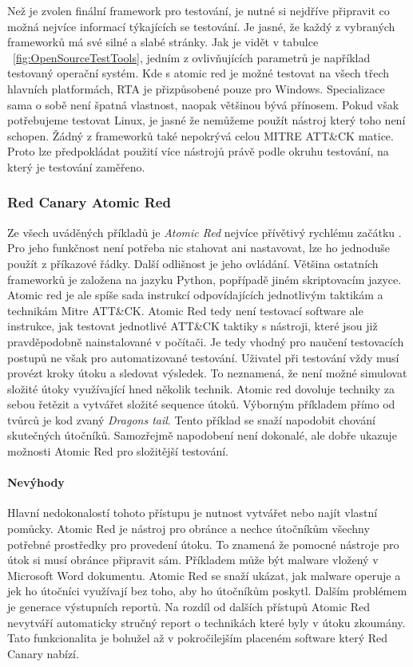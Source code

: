 Než je zvolen finální framework pro testování, je nutné si nejdříve připravit co možná nejvíce informací týkajících se testování.
Je jasné, že každý z vybraných frameworků má své silné a slabé stránky.
Jak je vidět v tabulce ~\ref{fig:OpenSourceTestTools}, jedním z ovlivňujících parametrů je například testovaný operační systém.
Kde s atomic red je možné testovat na všech třech hlavních platformách, \ac{RTA} je přizpůsobené pouze pro Windows.
Specializace sama o sobě není špatná vlastnost, naopak většinou bývá přínosem.
Pokud však potřebujeme testovat Linux, je jasné že nemůžeme použít nástroj který toho není schopen.
Žádný z frameworků také nepokrývá celou MITRE ATT\&CK matice.
Proto lze předpokládat použití více nástrojů právě podle okruhu testování, na který je testování zaměřeno.

\subsubsection{Red Canary Atomic Red}
Ze všech uváděných příkladů je \textit{Atomic Red} nejvíce přívětivý rychlému začátku .
Pro jeho funkčnost není potřeba nic stahovat ani nastavovat, lze ho jednoduše použít z příkazové řádky\cite{redcanary_atomic_red}.
Další odlišnost je jeho ovládání.
Většina ostatních frameworků je založena na jazyku Python, popřípadě jiném skriptovacím jazyce.
Atomic red je ale spíše sada instrukcí odpovídajících jednotlivým taktikám a technikám Mitre ATT\&CK\@.
Atomic Red tedy není testovací software ale instrukce, jak testovat jednotlivé ATT\&CK taktiky s nástroji, které jsou již pravděpodobně nainstalované v počítači.
Je tedy vhodný pro naučení testovacích postupů ne však pro automatizované testování.
Uživatel při testování vždy musí provézt kroky útoku a sledovat výsledek.
To neznamená, že není možné simulovat složité útoky využívající hned několik technik.
Atomic red dovoluje techniky za sebou řetězit a vytvářet složité sequence útoků.
Výborným příkladem přímo od tvůrců je kod zvaný \textit{Dragons tail}\cite{redcanary_dragons_tail}.
Tento příklad se snaží napodobit chování skutečných útočníků.
Samozřejmě napodobení není dokonalé, ale dobře ukazuje možnosti Atomic Red pro složitější testování.\cite{csoonline_4_testing_frameworks}

\paragraph{Nevýhody}
Hlavní nedokonalostí tohoto přístupu je nutnost vytvářet nebo najít vlastní pomůcky.
Atomic Red je nástroj pro obránce a nechce útočníkům všechny potřebné prostředky pro provedení útoku.
To znamená že pomocné nástroje pro útok si musí obránce připravit sám.
Příkladem může být malware vložený v Microsoft Word dokumentu.
Atomic Red se snaží ukázat, jak malware operuje a jek ho útočníci využívají bez toho, aby ho útočníkům poskytl.
Dalším problémem je generace výstupních reportů.
Na rozdíl od dalších přístupů Atomic Red nevytváří automaticky stručný report o technikách které byly v útoku zkoumány.
Tato funkcionalita je bohužel až v pokročilejším placeném software který Red Canary nabízí.\cite{csoonline_4_testing_frameworks}

